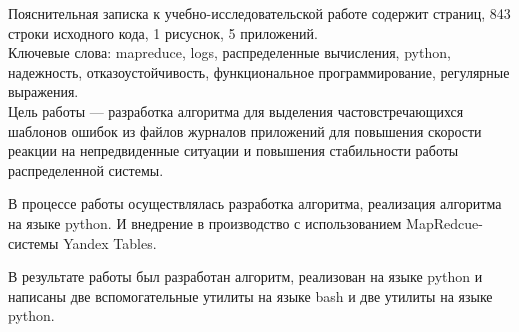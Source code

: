 \addtocounter{page}{1}
Пояснительная записка к учебно-исследовательской работе содержит
\pageref{LastPage} страниц, 843 строки исходного кода, 1 рисуснок,
5 приложений.\\

Ключевые слова: mapreduce, logs, распределенные вычисления, python, надежность,
отказоустойчивость, функциональное программирование, регулярные выражения.\\

Цель работы --- разработка алгоритма для выделения частовстречающихся шаблонов
ошибок из файлов журналов приложений для повышения скорости реакции
на непредвиденные ситуации и повышения стабильности работы распределенной
системы.

В процессе работы осуществлялась разработка алгоритма, реализация алгоритма на
языке python. И внедрение в производство с использованием MapRedcue-системы
Yandex Tables.

В результате работы был разработан алгоритм, реализован на языке
python и написаны две вспомогательные утилиты на языке bash и две утилиты
на языке python.


